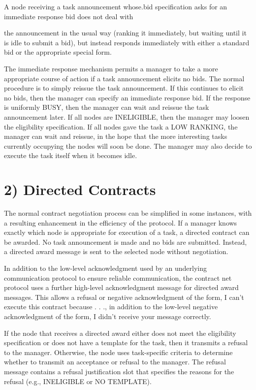 \documentclass[
]{article}
\begin{document}
A node receiving a task announcement whose.bid specification asks for an
immediate response bid does not deal with

the announcement in the usual way (ranking it immediately, but waiting
until it is idle to submit a bid), but instead responds immediately with
either a standard bid or the appropriate special form.

The immediate response mechanism permits a manager to take a more
appropriate course of action if a task announcement elicits no bids. The
normal procedure is to simply reissue the task announcement. If this
continues to elicit no bids, then the manager can specify an immediate
response bid. If the response is uniformly BUSY, then the manager can
wait and reissue the task announcement later. If all nodes are
INELIGIBLE, then the manager may loosen the eligibility specification.
If all nodes gave the task a LOW RANKING, the manager can wait and
reissue, in the hope that the more interesting tasks currently occupying
the nodes will soon be done. The manager may also decide to execute the
task itself when it becomes idle.

\section{2) Directed Contracts}\label{directed-contracts}

The normal contract negotiation process can be simplified in some
instances, with a resulting enhancement in the efficiency of the
protocol. If a manager knows exactly which node is appropriate for
execution of a task, a directed contract can be awarded. No task
announcement is made and no bids are submitted. Instead, a directed
award message is sent to the selected node without negotiation.

In addition to the low-level acknowledgment used by an underlying
communication protocol to ensure reliable communication, the contract
net protocol uses a further high-level acknowledgment message for
directed award messages. This allows a refusal or negative
acknowledgment of the form, I can't execute this contract because . . .,
in addition to the low-level negative acknowledgment of the form, I
didn't receive your message correctly.

If the node that receives a directed award either does not meet the
eligibility specification or does not have a template for the task, then
it transmits a refusal to the manager. Otherwise, the node uses
task-specific criteria to determine whether to transmit an acceptance or
refusal to the manager. The refusal message contains a refusal
justification slot that specifies the reasons for the refusal (e.g.,
INELIGIBLE or NO TEMPLATE).
\end{document}
